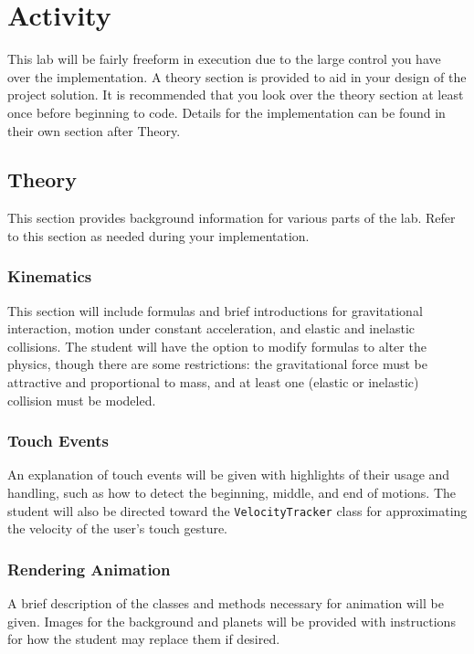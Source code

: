 \section{Activity}
This lab will be fairly freeform in execution due to the large control you have over the implementation.
A theory section is provided to aid in your design of the project solution.
It is recommended that you look over the theory section at least once before beginning to code.
Details for the implementation can be found in their own section after Theory.

\subsection{Theory}
This section provides background information for various parts of the lab.
Refer to this section as needed during your implementation.

\subsubsection{Kinematics}
This section will include formulas and brief introductions for gravitational interaction, motion under constant acceleration, and elastic and inelastic collisions. 
The student will have the option to modify formulas to alter the physics, though there are some restrictions: the gravitational force must be attractive and proportional to mass, and at least one (elastic or inelastic) collision must be modeled.

\subsubsection{Touch Events}

An explanation of touch events will be given with highlights of their usage and handling, such as how to detect the beginning, middle, and end of motions.
The student will also be directed toward the \verb=VelocityTracker= class for approximating the velocity of the user's touch gesture.

\subsubsection{Rendering Animation}

A brief description of the classes and methods necessary for animation will be given.
Images for the background and planets will be provided with instructions for how the student may replace them if desired.

